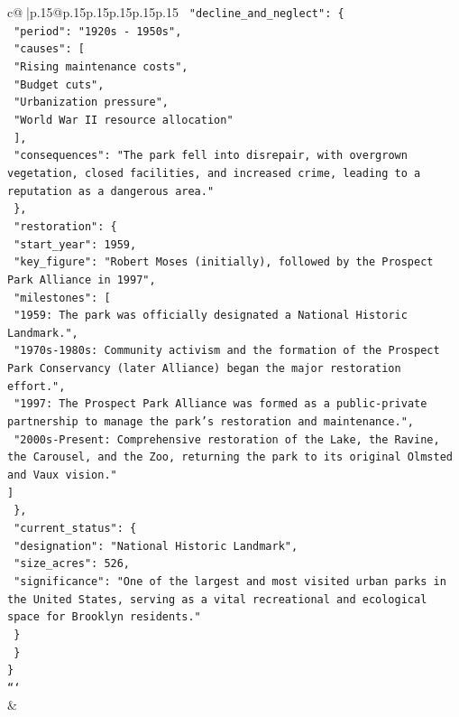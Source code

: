 \documentclass{article}
\begin{document}
{\begin{supertabular}{c@{$\;$}|p{.15\linewidth}@{}p{.15\linewidth}p{.15\linewidth}p{.15\linewidth}p{.15\linewidth}p{.15\linewidth}}
{{{\texttt{    "decline\_and\_neglect": \{} \\
\texttt{      "period": "1920s {-} 1950s",} \\
\texttt{      "causes": {[}} \\
\texttt{        "Rising maintenance costs",} \\
\texttt{        "Budget cuts",} \\
\texttt{        "Urbanization pressure",} \\
\texttt{        "World War II resource allocation"} \\
\texttt{      {]},} \\
\texttt{      "consequences": "The park fell into disrepair, with overgrown vegetation, closed facilities, and increased crime, leading to a reputation as a dangerous area."} \\
\texttt{    \},} \\
\texttt{    "restoration": \{} \\
\texttt{      "start\_year": 1959,} \\
\texttt{      "key\_figure": "Robert Moses (initially), followed by the Prospect Park Alliance in 1997",} \\
\texttt{      "milestones": {[}} \\
\texttt{        "1959: The park was officially designated a National Historic Landmark.",} \\
\texttt{        "1970s{-}1980s: Community activism and the formation of the Prospect Park Conservancy (later Alliance) began the major restoration effort.",} \\
\texttt{        "1997: The Prospect Park Alliance was formed as a public{-}private partnership to manage the park's restoration and maintenance.",} \\
\texttt{        "2000s{-}Present: Comprehensive restoration of the Lake, the Ravine, the Carousel, and the Zoo, returning the park to its original Olmsted and Vaux vision."} \\
\texttt{      {]}} \\
\texttt{    \},} \\
\texttt{    "current\_status": \{} \\
\texttt{      "designation": "National Historic Landmark",} \\
\texttt{      "size\_acres": 526,} \\
\texttt{      "significance": "One of the largest and most visited urban parks in the United States, serving as a vital recreational and ecological space for Brooklyn residents."} \\
\texttt{    \}} \\
\texttt{  \}} \\
\texttt{\}} \\
\texttt{```} \\
            }
        }
    }
    & \\ \\


\end{supertabular}}
\end{document}
